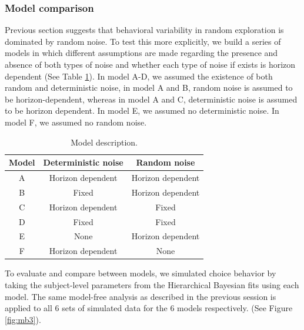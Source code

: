 \documentclass[12pt]{article}
\begin{document}
	
	\subsubsection*{Model comparison}
	Previous section suggests that behavioral variability in random exploration is dominated by random noise. To test this more explicitly, we build a series of models in which different assumptions are made regarding the presence and absence of both types of noise and whether each type of noise if exists is horizon dependent (See Table \ref{tab:models}). In model A-D, we assumed the existence of both random and deterministic noise, in model A and B, random noise is assumed to be horizon-dependent, whereas in model A and C, deterministic noise is assumed to be horizon dependent. In model E, we assumed no deterministic noise. In model F, we assumed no random noise. 
	
	\begin{table}[h]
		\small
		\centering
		\begin{tabular}{|c|c|c|}
			\hline
			Model & Deterministic noise & Random noise \\
			\hline
			A & Horizon dependent & Horizon dependent\\
			\hline
			B & Fixed & Horizon dependent\\
			\hline
			C & Horizon dependent & Fixed\\
			\hline
			D & Fixed & Fixed\\
			\hline
			E & None & Horizon dependent\\
			\hline
			F & Horizon dependent & None\\
			\hline
		\end{tabular}
		\caption{Model description. }%
		\label{tab:models}	
	\end{table}
	
	To evaluate and compare between models, we simulated choice behavior by taking the subject-level parameters from the Hierarchical Bayesian fits using each model. The same model-free analysis as described in the previous session is applied to all 6 sets of simulated data for the 6 models respectively. (See Figure  \ref{fig:mb3}). 
	
\end{document}
